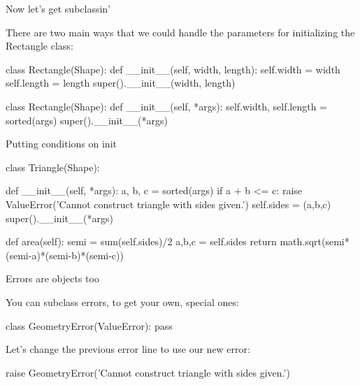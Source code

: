 \documentclass[aspectratio=149, handout] {beamer}
\begin{document}
\begin{frame}[fragile]{Now let's get subclassin'}

There are two main ways that we could handle the parameters for initializing the Rectangle class:
\begin{pythoncode}
class Rectangle(Shape):
    def __init__(self, width, length):
        self.width = width
        self.length = length
        super().__init__(width, length)
\end{pythoncode}

\begin{pythoncode}
class Rectangle(Shape):
    def __init__(self, *args):
        self.width, self.length = sorted(args)
        super().__init__(*args)
\end{pythoncode}

\end{frame}


\begin{frame}[fragile]{Putting conditions on init}

  \begin{pythoncode}
    class Triangle(Shape):
    
        def __init__(self, *args):
            a, b, c = sorted(args)
            if a + b <= c:
                raise ValueError('Cannot construct triangle with sides given.')
            self.sides = (a,b,c)
            super().__init__(*args)
    
        def area(self):
            semi = sum(self.sides)/2
            a,b,c = self.sides
            return math.sqrt(semi*(semi-a)*(semi-b)*(semi-c))
    
  \end{pythoncode}

\end{frame}



\begin{frame}[fragile]{Errors are objects too}

  You can subclass errors, to get your own, special ones: \pause
  \begin{pythoncode}
    class GeometryError(ValueError):
        pass
  \end{pythoncode}
  
  \medskip \pause
  
  Let's change the previous error line to use our new error:
  
  \begin{smallpythoncode}
    raise GeometryError('Cannot construct triangle with sides given.')
  \end{smallpythoncode}
  



\end{frame}
\end{document}
